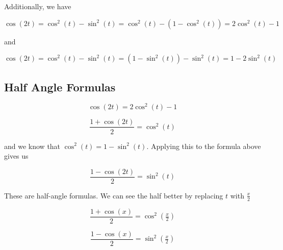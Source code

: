 \documentclass{ximera}
\begin{document}
Additionally, we have 




\[   \cos(2t) =    \cos^2(t) - \sin^2(t)  =    \cos^2(t) - (1 - \cos^2(t)) =  2 \cos^2(t) - 1 \]


and

\[   \cos(2t) =    \cos^2(t) - \sin^2(t)  =    (1 - \sin^2(t)) - \sin^2(t)  = 1 - 2 \sin^2(t)     \]




































\subsection*{Half Angle Formulas}



\[   \cos(2t)  =  2 \cos^2(t) - 1 \]


\[   \frac{1 + \cos(2t)}{2}  =   \cos^2(t)  \]



and we know that $\cos^2(t) = 1- \sin^2(t)$. Applying this to the formula above gives us

\[  \frac{1 -  \cos(2t)}{2}  =  \sin^2(t)     \]



These are half-angle formulas.  We can see the half better by replacing $t$ with $\frac{x}{2}$



\[   \frac{1 + \cos(x)}{2}  =   \cos^2\left( \tfrac{x}{2} \right)  \]



\[   \frac{1 - \cos(x)}{2}  =   \sin^2\left( \tfrac{x}{2} \right)  \]
\end{document}
